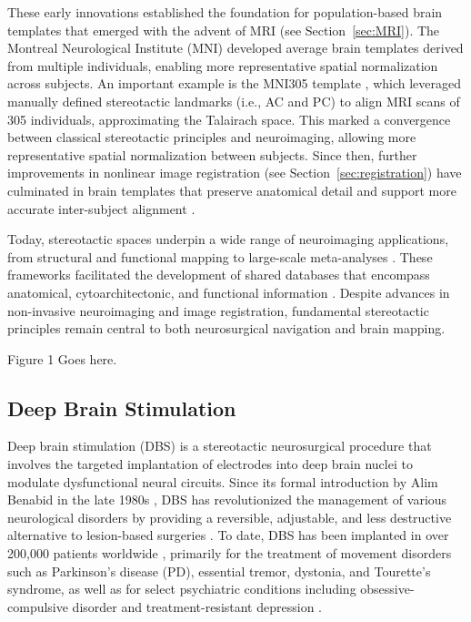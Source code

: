 These early innovations established the foundation for population-based brain templates that emerged with the advent of MRI (see Section~\ref{sec:MRI}). The Montreal Neurological Institute (MNI) developed average brain templates derived from multiple individuals, enabling more representative spatial normalization across subjects. An important example is the MNI305 template \cite{Collins1994-ue}, which leveraged manually defined stereotactic landmarks (i.e., AC and PC) to align MRI scans of 305 individuals, approximating the Talairach space. This marked a convergence between classical stereotactic principles and neuroimaging, allowing more representative spatial normalization between subjects. Since then, further improvements in nonlinear image registration (see Section~\ref{sec:registration}) have culminated in brain templates that preserve anatomical detail and support more accurate inter-subject alignment \cite{Fonov2009-oi}.

Today, stereotactic spaces underpin a wide range of neuroimaging applications, from structural and functional mapping to large-scale meta-analyses \cite{Yarkoni2011-sr,Dockes2020-nw}. These frameworks facilitated the development of shared databases that encompass anatomical, cytoarchitectonic, and functional information \cite{Eickhoff2005-qb}. Despite advances in non-invasive neuroimaging and image registration, fundamental stereotactic principles remain central to both neurosurgical navigation and brain mapping.

Figure 1 Goes here.

\subsection{Deep Brain Stimulation}
Deep brain stimulation (DBS) is a stereotactic neurosurgical procedure that involves the targeted implantation of electrodes into deep brain nuclei to modulate dysfunctional neural circuits. Since its formal introduction by Alim Benabid in the late 1980s \cite{Benabid1987-mp}, DBS has revolutionized the management of various neurological disorders by providing a reversible, adjustable, and less destructive alternative to lesion-based surgeries \cite{Limousin1990-oz,The-Deep-Brain-Stimulation-for-Parkinson-s-Disease-Study-Group2001-ss}. To date, DBS has been implanted in over 200,000 patients worldwide \cite{Schulder2023-aj}, primarily for the treatment of movement disorders such as Parkinson's disease (PD), essential tremor, dystonia, and Tourette’s syndrome, as well as for select psychiatric conditions including obsessive-compulsive disorder and treatment-resistant depression \cite{Lozano2019-dv}.

